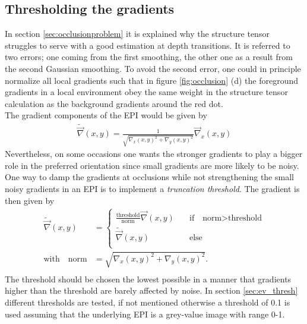 \documentclass  [
  paper    = a4,
  BCOR     = 10mm,
  twoside,
  fontsize = 12pt,
  fleqn,
  toc      = bibnumbered,
  toc      = listofnumbered,
  numbers  = noendperiod,
  headings = normal,
  listof   = leveldown,
  version  = 3.03
]                                       {scrreprt}
\begin{document}
 \subsection{Thresholding the gradients}
 \label{sec:thresholdinggradients}
 In section \ref{sec:occlusionproblem} it is explained why the structure tensor struggles to serve with a  good estimation at depth transitions. It is referred to two errors; one coming from the first smoothing, the other one as a result from the second Gaussian smoothing. To avoid the second error, one could in principle normalize all local gradients such that in figure \ref{fig:occlusion} (d) the foreground gradients in a local environment obey the same weight in the structure tensor calculation as the background gradients around the red dot.\\
 The gradient components of the EPI would be given by
 \begin{align}
 	\tilde{\vec \nabla}(x,y) = \frac{1}{\sqrt{\nabla_x(x,y)^2 + \nabla_y(x,y)^2}} \vec \nabla_x(x,y)
 \end{align}
 Nevertheless, on some occasions one wants the stronger gradients to play a bigger role in the preferred orientation since small gradients are more likely to be noisy. One way to damp the gradients at occlusions while not strengthening the small noisy gradients in an EPI is to implement a \textit{truncation threshold}. The gradient is then given by
 \begin{align}
 \tilde{\vec \nabla}(x,y) &= \begin{cases}
\frac{\text{threshold}}{\text{norm}} \vec \nabla(x,y) \quad &\text{if}\quad \text{norm}> \text{threshold}\\
\tilde{\vec \nabla}(x,y)\qquad &\text{else}\\
 \end{cases} \\
\text{with} \quad \text{norm} &= \sqrt{\nabla_x(x,y)^2 + \nabla_y(x,y)^2}.\\
 \end{align}
 The threshold should be chosen the lowest possible in a manner that gradients higher than the threshold are barely affected by noise. In section \ref{sec:ev_thresh} different thresholds are tested, if not mentioned otherwise a threshold of 0.1 is used assuming that the underlying EPI is a grey-value image with range 0-1.\\
 
\end{document}

